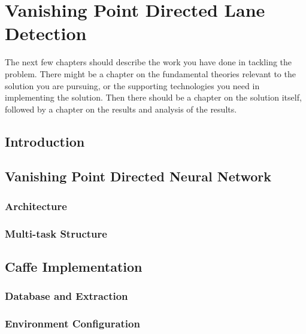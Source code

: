 
\chapter{Vanishing Point Directed Lane Detection}
\label{cha:model}
\begin{spacing}{1.5}
\setlength{\parskip}{0.3in}

The next few chapters should describe the work you have done in tackling the problem. There might be a chapter on the fundamental theories relevant to the solution you are pursuing, or the supporting technologies you need in implementing the solution. Then there should be a chapter on the solution itself, followed by a chapter on the results and analysis of the results.

\section{Introduction}



\section{Vanishing Point Directed Neural Network}
\label{sec:MD_model}

\subsection{Architecture}

\subsection{Multi-task Structure}


\section{Caffe Implementation}
\label{sec:MD_CAFFE}

\subsection{Database and Extraction}

\subsection{Environment Configuration}


\end{spacing}
